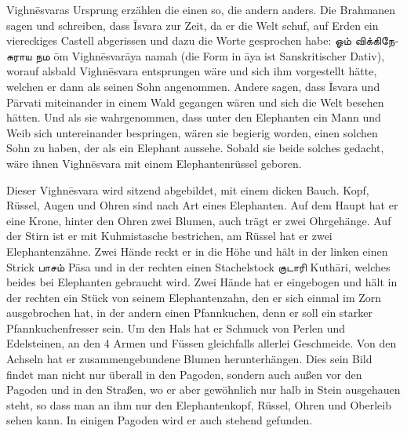 \documentclass{article}
\newcommand{\TamilText}[1]{\texttamil{#1}}
\newcommand{\tam}[1]{\TamilText{#1}}
\begin{document}
Vighn\={e}svaras Ursprung erzählen die einen so, die andern anders. Die Brahmanen sagen und schreiben, dass \={I}svara zur Zeit, da er die Welt schuf, auf Erden ein viereckiges Castell abgerissen und dazu die Worte gesprochen habe: \tam{ஓம்} \tam{விக்கிநேசுராய} \tam{நம} \={o}m Vighn\={e}svar\={a}ya namah (die Form in \={a}ya ist Sanskritischer Dativ), worauf alsbald Vighn\={e}svara entsprungen wäre und sich ihm vorgestellt hätte, welchen er dann als seinen Sohn angenommen. Andere sagen, dass \={I}svara und P\={a}rvati miteinander in einem Wald gegangen wären und sich die Welt besehen hätten. Und als sie wahrgenommen, dass unter den Elephanten ein Mann und Weib sich untereinander bespringen, wären sie begierig worden, einen solchen Sohn zu haben, der als ein Elephant aussehe. Sobald sie beide solches gedacht, wäre ihnen Vighn\={e}svara mit einem Elephantenrüssel geboren.

Dieser Vighn\={e}svara wird sitzend abgebildet, mit einem dicken Bauch. Kopf, Rüssel, Augen und Ohren sind nach Art eines Elephanten. Auf dem Haupt hat er eine Krone, hinter den Ohren zwei Blumen, auch trägt er zwei Ohrgehänge. Auf der Stirn ist er mit Kuhmistasche bestrichen, am Rüssel hat er zwei Elephantenzähne. Zwei Hände reckt er in die Höhe und hält in der linken einen Strick \tam{பாசம்} P\={a}sa und in der rechten einen Stachelstock \tam{குடாரி} Kuth\={a}ri, welches beides bei Elephanten gebraucht wird. Zwei Hände hat er eingebogen und hält in der rechten ein Stück von seinem Elephantenzahn, den er sich einmal im Zorn ausgebrochen hat, in der andern einen Pfannkuchen, denn er soll ein starker Pfannkuchenfresser sein. Um den Hals hat er Schmuck von Perlen und Edelsteinen, an den 4 Armen und Füssen gleichfalls allerlei Geschmeide. Von den Achseln hat er zusammengebundene Blumen herunterhängen. Dies sein Bild findet man nicht nur überall in den Pagoden, sondern auch außen vor den Pagoden und in den Straßen, wo er aber gewöhnlich nur halb in Stein ausgehauen steht, so dass man an ihm nur den Elephantenkopf, Rüssel, Ohren und Oberleib sehen kann. In einigen Pagoden wird er auch stehend gefunden.
\end{document}

